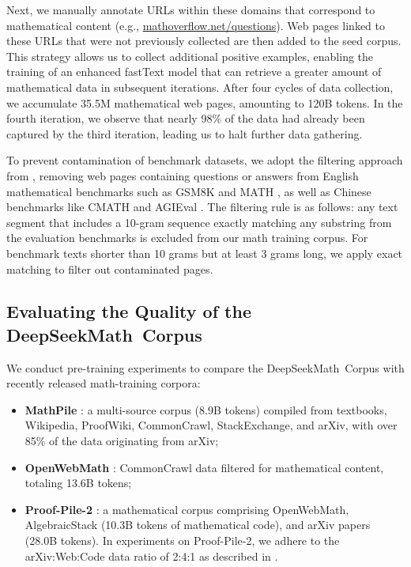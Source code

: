 Next, we manually annotate URLs within these domains that correspond to mathematical content (e.g., \url{mathoverflow.net/questions}). Web pages linked to these URLs that were not previously collected are then added to the seed corpus. This strategy allows us to collect additional positive examples, enabling the training of an enhanced fastText model that can retrieve a greater amount of mathematical data in subsequent iterations. After four cycles of data collection, we accumulate 35.5M mathematical web pages, amounting to 120B tokens. In the fourth iteration, we observe that nearly 98\% of the data had already been captured by the third iteration, leading us to halt further data gathering.

To prevent contamination of benchmark datasets, we adopt the filtering approach from \cite{deepseek-coder}, removing web pages containing questions or answers from English mathematical benchmarks such as GSM8K \citep{gsm8k} and MATH \citep{MATH}, as well as Chinese benchmarks like CMATH \citep{wei2023cmath} and AGIEval \citep{agieval}. The filtering rule is as follows: any text segment that includes a 10-gram sequence exactly matching any substring from the evaluation benchmarks is excluded from our math training corpus. For benchmark texts shorter than 10 grams but at least 3 grams long, we apply exact matching to filter out contaminated pages.

\subsection{Evaluating the Quality of the DeepSeekMath~Corpus}

We conduct pre-training experiments to compare the DeepSeekMath~Corpus with recently released math-training corpora:

\begin{itemize}[topsep=0pt]
    \item \textbf{MathPile} \citep{mathpile}: a multi-source corpus (8.9B tokens) compiled from textbooks, Wikipedia, ProofWiki, CommonCrawl, StackExchange, and arXiv, with over 85\% of the data originating from arXiv;
    \item \textbf{OpenWebMath} \citep{openwebmath}: CommonCrawl data filtered for mathematical content, totaling 13.6B tokens;
    \item \textbf{Proof-Pile-2} \citep{llemma}: a mathematical corpus comprising OpenWebMath, AlgebraicStack (10.3B tokens of mathematical code), and arXiv papers (28.0B tokens). In experiments on Proof-Pile-2, we adhere to the arXiv:Web:Code data ratio of 2:4:1 as described in \cite{llemma}.
\end{itemize}

